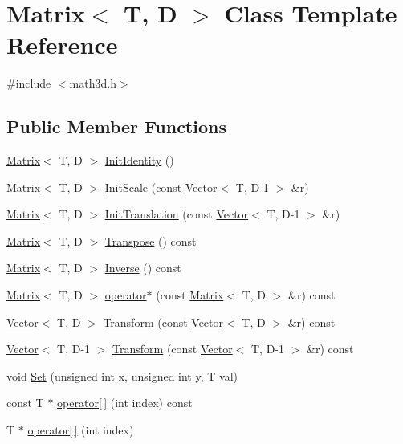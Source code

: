 \hypertarget{class_matrix}{}\section{Matrix$<$ T, D $>$ Class Template Reference}
\label{class_matrix}


{\ttfamily \#include $<$math3d.\+h$>$}

\subsection*{Public Member Functions}
\begin{DoxyCompactItemize}
\item 
\hyperlink{class_matrix}{Matrix}$<$ T, D $>$ \hyperlink{class_matrix_aa6653ba9d81668d11bfafae3df9d7e36}{Init\+Identity} ()
\item 
\hyperlink{class_matrix}{Matrix}$<$ T, D $>$ \hyperlink{class_matrix_a669ac3058ca94ee6bcb0bb6d65693942}{Init\+Scale} (const \hyperlink{class_vector}{Vector}$<$ T, D-\/1 $>$ \&r)
\item 
\hyperlink{class_matrix}{Matrix}$<$ T, D $>$ \hyperlink{class_matrix_a085e7210b168aaa55c2c9c5932d33fd7}{Init\+Translation} (const \hyperlink{class_vector}{Vector}$<$ T, D-\/1 $>$ \&r)
\item 
\hyperlink{class_matrix}{Matrix}$<$ T, D $>$ \hyperlink{class_matrix_ada41ba03c5fd295ce9fccfaee4fcc8c9}{Transpose} () const 
\item 
\hyperlink{class_matrix}{Matrix}$<$ T, D $>$ \hyperlink{class_matrix_a5f645b7f8f35938348ededc07e2f689c}{Inverse} () const 
\item 
\hyperlink{class_matrix}{Matrix}$<$ T, D $>$ \hyperlink{class_matrix_a4e4a905d09213282c802a90d44d693c6}{operator$\ast$} (const \hyperlink{class_matrix}{Matrix}$<$ T, D $>$ \&r) const 
\item 
\hyperlink{class_vector}{Vector}$<$ T, D $>$ \hyperlink{class_matrix_af57977803e2ec19bfbc9ab56b9afaed1}{Transform} (const \hyperlink{class_vector}{Vector}$<$ T, D $>$ \&r) const 
\item 
\hyperlink{class_vector}{Vector}$<$ T, D-\/1 $>$ \hyperlink{class_matrix_af9c8c3f95c7f4d5af195695c552d88da}{Transform} (const \hyperlink{class_vector}{Vector}$<$ T, D-\/1 $>$ \&r) const 
\item 
void \hyperlink{class_matrix_a24005a942d94e7dae6a6c6d076d9b6fa}{Set} (unsigned int x, unsigned int y, T val)
\item 
const T $\ast$ \hyperlink{class_matrix_af32d2322ab44e083492cfd91b80d5418}{operator\mbox{[}$\,$\mbox{]}} (int index) const 
\item 
T $\ast$ \hyperlink{class_matrix_ae5706ecdcc918c8b0c4e94d3360d629e}{operator\mbox{[}$\,$\mbox{]}} (int index)
\end{DoxyCompactItemize}


